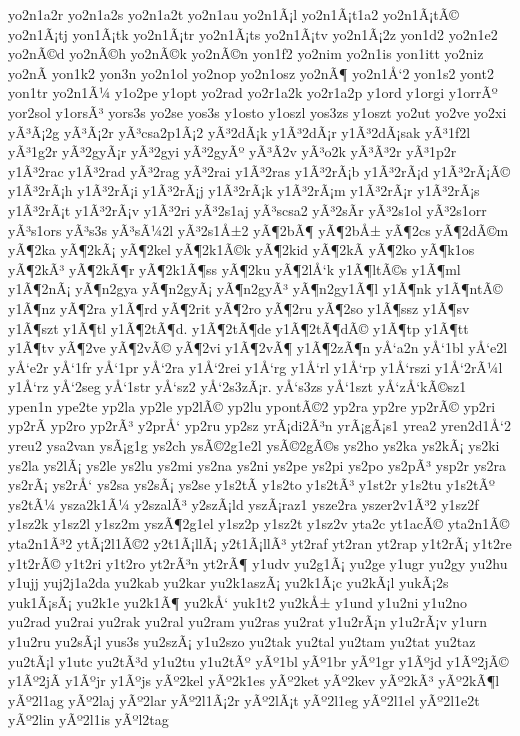 {yo2n1a2r
yo2n1a2s
yo2n1a2t
yo2n1au
yo2n1Ã¡l
yo2n1Ã¡t1a2
yo2n1Ã¡tÃ©
yo2n1Ã¡tj
yon1Ã¡tk
yo2n1Ã¡tr
yo2n1Ã¡ts
yo2n1Ã¡tv
yo2n1Ã¡2z
yon1d2
yo2n1e2
yo2nÃ©d
yo2nÃ©h
yo2nÃ©k
yo2nÃ©n
yon1f2
yo2nim
yo2n1is
yon1itt
yo2niz
yo2nÃ­
yon1k2
yon3n
yo2n1ol
yo2nop
yo2n1osz
yo2nÃ¶
yo2n1Å‘2
yon1s2
yont2
yon1tr
yo2n1Ã¼
y1o2pe
y1opt
yo2rad
yo2r1a2k
yo2r1a2p
y1ord
y1orgi
y1orrÃº
yor2sol
y1orsÃ³
yors3s
yo2se
yos3s
y1osto
y1oszl
yos3zs
y1oszt
yo2ut
yo2ve
yo2xi
yÃ³Ã¡2g
yÃ³Ã¡2r
yÃ³csa2p1Ã¡2
yÃ³2dÃ¡k
y1Ã³2dÃ¡r
y1Ã³2dÃ¡sak
yÃ³1f2l
yÃ³1g2r
yÃ³2gyÃ¡r
yÃ³2gyi
yÃ³2gyÃº
yÃ³Ã­2v
yÃ³o2k
yÃ³Ã³2r
yÃ³1p2r
y1Ã³2rac
y1Ã³2rad
yÃ³2rag
yÃ³2rai
y1Ã³2ras
y1Ã³2rÃ¡b
y1Ã³2rÃ¡d
y1Ã³2rÃ¡Ã©
y1Ã³2rÃ¡h
y1Ã³2rÃ¡i
y1Ã³2rÃ¡j
y1Ã³2rÃ¡k
y1Ã³2rÃ¡m
y1Ã³2rÃ¡r
y1Ã³2rÃ¡s
y1Ã³2rÃ¡t
y1Ã³2rÃ¡v
y1Ã³2ri
yÃ³2s1aj
yÃ³scsa2
yÃ³2sÃ­r
yÃ³2s1ol
yÃ³2s1orr
yÃ³s1ors
yÃ³s3s
yÃ³sÃ¼2l
yÃ³2s1Å±2
yÃ¶2bÃ¶
yÃ¶2bÅ±
yÃ¶2cs
yÃ¶2dÃ©m
yÃ¶2ka
yÃ¶2kÃ¡
yÃ¶2kel
yÃ¶2k1Ã©k
yÃ¶2kid
yÃ¶2kÃ­
yÃ¶2ko
yÃ¶k1os
yÃ¶2kÃ³
yÃ¶2kÃ¶r
yÃ¶2k1Ã¶ss
yÃ¶2ku
yÃ¶2lÅ‘k
y1Ã¶ltÃ©s
y1Ã¶ml
y1Ã¶2nÃ¡
yÃ¶n2gya
yÃ¶n2gyÃ¡
yÃ¶n2gyÃ³
yÃ¶n2gy1Ã¶l
y1Ã¶nk
y1Ã¶ntÃ©
y1Ã¶nz
yÃ¶2ra
y1Ã¶rd
yÃ¶2rit
yÃ¶2ro
yÃ¶2ru
yÃ¶2so
y1Ã¶ssz
y1Ã¶sv
y1Ã¶szt
y1Ã¶tl
y1Ã¶2tÃ¶d.
y1Ã¶2tÃ¶de
y1Ã¶2tÃ¶dÃ©
y1Ã¶tp
y1Ã¶tt
y1Ã¶tv
yÃ¶2ve
yÃ¶2vÃ©
yÃ¶2vi
y1Ã¶2vÃ¶
y1Ã¶2zÃ¶n
yÅ‘a2n
yÅ‘1bl
yÅ‘e2l
yÅ‘e2r
yÅ‘1fr
yÅ‘1pr
yÅ‘2ra
y1Å‘2rei
y1Å‘rg
y1Å‘rl
y1Å‘rp
y1Å‘rszi
y1Å‘2rÃ¼l
y1Å‘rz
yÅ‘2seg
yÅ‘1str
yÅ‘sz2
yÅ‘2s3zÃ¡r.
yÅ‘s3zs
yÅ‘1szt
yÅ‘zÅ‘kÃ©sz1
ypen1n
ype2te
yp2la
yp2le
yp2lÃ©
yp2lu
ypontÃ©2
yp2ra
yp2re
yp2rÃ©
yp2ri
yp2rÃ­
yp2ro
yp2rÃ³
y2prÅ‘
yp2ru
yp2sz
yrÃ¡di2Ã³n
yrÃ¡gÃ¡s1
yrea2
yren2d1Å‘2
yreu2
ysa2van
ysÃ¡g1g
ys2ch
ysÃ©2g1e2l
ysÃ©2gÃ©s
ys2ho
ys2ka
ys2kÃ¡
ys2ki
ys2la
ys2lÃ¡
ys2le
ys2lu
ys2mi
ys2na
ys2ni
ys2pe
ys2pi
ys2po
ys2pÃ³
ysp2r
ys2ra
ys2rÃ¡
ys2rÅ‘
ys2sa
ys2sÃ¡
ys2se
y1s2tÃ­
y1s2to
y1s2tÃ³
y1st2r
y1s2tu
y1s2tÃº
ys2tÃ¼
ysza2k1Ã¼
y2szalÃ³
y2szÃ¡ld
yszÃ¡raz1
ysze2ra
yszer2v1Ã³2
y1sz2f
y1sz2k
y1sz2l
y1sz2m
yszÃ¶2g1el
y1sz2p
y1sz2t
y1sz2v
yta2c
yt1acÃ©
yta2n1Ã©
yta2n1Ã³2
ytÃ¡2l1Ã©2
y2t1Ã¡llÃ¡
y2t1Ã¡llÃ³
yt2raf
yt2ran
yt2rap
y1t2rÃ¡
y1t2re
y1t2rÃ©
y1t2ri
y1t2ro
yt2rÃ³n
yt2rÃ¶
y1udv
yu2g1Ã¡
yu2ge
y1ugr
yu2gy
yu2hu
y1ujj
yuj2j1a2da
yu2kab
yu2kar
yu2k1aszÃ¡
yu2k1Ã¡c
yu2kÃ¡l
yukÃ¡2s
yuk1Ã¡sÃ¡
yu2k1e
yu2k1Ã¶
yu2kÅ‘
yuk1t2
yu2kÅ±
y1und
y1u2ni
y1u2no
yu2rad
yu2rai
yu2rak
yu2ral
yu2ram
yu2ras
yu2rat
y1u2rÃ¡n
y1u2rÃ¡v
y1urn
y1u2ru
yu2sÃ¡l
yus3s
yu2szÃ¡
y1u2szo
yu2tak
yu2tal
yu2tam
yu2tat
yu2taz
yu2tÃ¡l
y1utc
yu2tÃ³d
y1u2tu
y1u2tÃº
yÃº1bl
yÃº1br
yÃº1gr
y1Ãºjd
y1Ãº2jÃ©
y1Ãº2jÃ­
y1Ãºjr
y1Ãºjs
yÃº2kel
yÃº2k1es
yÃº2ket
yÃº2kev
yÃº2kÃ³
yÃº2kÃ¶l
yÃº2l1ag
yÃº2laj
yÃº2lar
yÃº2l1Ã¡2r
yÃº2lÃ¡t
yÃº2l1eg
yÃº2l1el
yÃº2l1e2t
yÃº2lin
yÃº2l1is
yÃºl2tag
}
